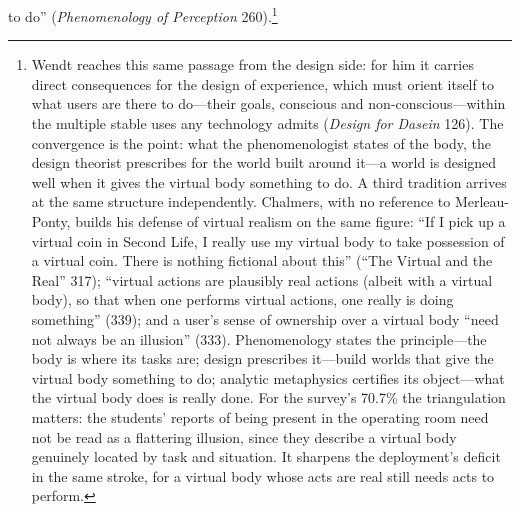 to do'' (\textit{Phenomenology of Perception} 260).\footnote{Wendt
reaches this same passage from the design side: for him it carries
direct consequences for the design of experience, which must orient
itself to what users are there to do---their goals, conscious and
non-conscious---within the multiple stable uses any technology admits
(\textit{Design for Dasein} 126). The convergence is the point: what
the phenomenologist states of the body, the design theorist prescribes
for the world built around it---a world is designed well when it gives
the virtual body something to do. A third tradition arrives at the same
structure independently. Chalmers, with no reference to Merleau-Ponty,
builds his defense of virtual realism on the same figure: ``If I pick
up a virtual coin in Second Life, I really use my virtual body to take
possession of a virtual coin. There is nothing fictional about this''
(``The Virtual and the Real'' 317); ``virtual actions are plausibly
real actions (albeit with a virtual body), so that when one performs
virtual actions, one really is doing something'' (339); and a user's
sense of ownership over a virtual body ``need not always be an
illusion'' (333). Phenomenology states the principle---the body is
where its tasks are; design prescribes it---build worlds that give the
virtual body something to do; analytic metaphysics certifies its
object---what the virtual body does is really done. For the survey's
70.7\% the triangulation matters: the students' reports of being
present in the operating room need not be read as a flattering
illusion, since they describe a virtual body genuinely located by task
and situation. It sharpens the deployment's deficit in the same stroke,
for a virtual body whose acts are real still needs acts to perform.}
